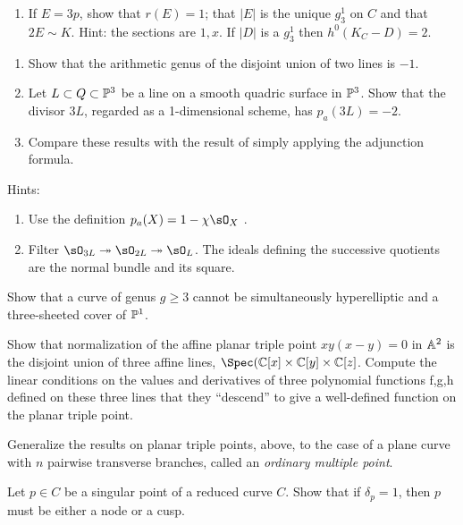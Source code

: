 \begin{exercise}
\begin{enumerate}
\item If $E = 3p$, show that $r(E) = 1$; that $|E|$ is the unique $g^1_3$ on $C$ and that $2E \sim K$.
Hint: the sections are $1,x$. If $|D|$ is a  $g^1_3$ then $h^0(K_C-D) = 2$.
\end{enumerate}
\end{exercise}


\begin{exercise}\label{pa example}
\begin{enumerate}
 \item Show that the arithmetic genus of the disjoint union of two lines is $-1$.
\item Let $L\subset Q\subset \PP^3$ be a line on a smooth quadric surface in $\PP^3$. Show that the 
divisor $3L$, regarded as a 1-dimensional scheme, has $p_a(3L) = -2$.
\item Compare these results with the result of simply applying the adjunction formula.
\end{enumerate}
Hints:
\begin{enumerate}
 \item Use the definition $p_a(X) = 1-\chi \sO_X$ .
 \item Filter $\sO_{3L} \twoheadrightarrow \sO_{2L} \twoheadrightarrow \sO_L$. The ideals
 defining the successive quotients are the normal bundle and its square. 
\end{enumerate}
\end{exercise}

\begin{exercise}\label{gonality exclusion}
Show that a curve of genus $g \geq 3$ cannot be simultaneously hyperelliptic and a three-sheeted cover of $\PP^1$.
\end{exercise}

\begin{exercise}\label{planar triple pt}
Show that normalization of the affine planar triple point $xy(x-y) = 0$ in $\AA^2$ is the disjoint union of three
affine lines, $\Spec(\CC[x] \times \CC[y]\times \CC[z]$. Compute the linear conditions on the values and derivatives of three polynomial functions f,g,h defined on
these three lines that they ``descend'' to give a well-defined function on the planar triple point.
\end{exercise}

\begin{exercise} Generalize the results on planar triple points, above, to the case of a plane curve with $n$ pairwise
transverse branches, called an \emph{ordinary multiple point}.
\end{exercise}

\begin{exercise}\label{delta=1 characterization}
Let $p \in C$ be a singular point of a reduced curve $C$. Show that if $\delta_p = 1$, then $p$ must be either a node or a cusp.
\end{exercise}

